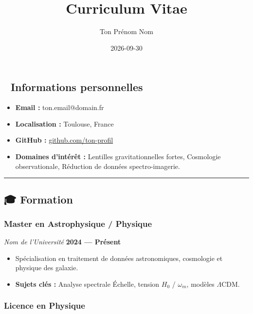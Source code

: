 \documentclass[
]{article}
\title{Curriculum Vitae}
\author{Ton Prénom Nom}
\date{2026-09-30}
\providecommand{\tightlist}{%
  \setlength{\itemsep}{0pt}\setlength{\parskip}{0pt}}
\begin{document}
\maketitle


\subsection{👤 Informations
personnelles}\label{informations-personnelles}

\begin{itemize}
\tightlist
\item
  \textbf{Email :} ton.email@domain.fr
\item
  \textbf{Localisation :} Toulouse, France
\item
  \textbf{GitHub :} \href{https://github.com}{github.com/ton-profil}
\item
  \textbf{Domaines d'intérêt :} Lentilles gravitationnelles fortes,
  Cosmologie observationale, Réduction de données spectro-imagerie.
\end{itemize}

\begin{center}\rule{0.5\linewidth}{0.5pt}\end{center}

\subsection{🎓 Formation}\label{formation}

\subsubsection{Master en Astrophysique /
Physique}\label{master-en-astrophysique-physique}

\emph{Nom de l'Université} \textbar{} \textbf{2024 --- Présent}

\begin{itemize}
\tightlist
\item
  Spécialisation en traitement de données astronomiques, cosmologie et
  physique des galaxie.
\item
  \textbf{Sujets clés :} Analyse spectrale Échelle, tension \(H_0\) /
  \(\omega_m\), modèles \(\Lambda\text{CDM}\).
\end{itemize}

\subsubsection{Licence en Physique}\label{licence-en-physique}
\end{document}
